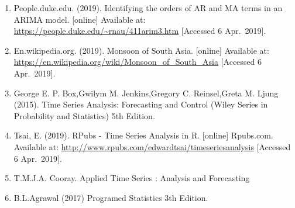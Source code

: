 \documentclass[12pt,openany]{book}
\begin{document}
\begin{enumerate}
\def\labelenumi{\arabic{enumi}.}
\item
  People.duke.edu. (2019). Identifying the orders of AR and MA terms in an ARIMA model. {[}online{]} Available at: \url{https://people.duke.edu/~rnau/411arim3.htm} {[}Accessed 6 Apr.~2019{]}.
\item
  En.wikipedia.org. (2019). Monsoon of South Asia. {[}online{]} Available at: \url{https://en.wikipedia.org/wiki/Monsoon_of_South_Asia} {[}Accessed 6 Apr.~2019{]}.
\item
  George E. P. Box,Gwilym M. Jenkins,Gregory C. Reinsel,Greta M. Ljung (2015). Time Series Analysis: Forecasting and Control (Wiley Series in Probability and Statistics) 5th Edition.
\item
  Tsai, E. (2019). RPubs - Time Series Analysis in R. {[}online{]} Rpubs.com. Available at: \url{http://www.rpubs.com/edwardtsai/timeseriesanalysis} {[}Accessed 6 Apr.~2019{]}.
\item
  T.M.J.A. Cooray. Applied Time Series : Analysis and Forecasting
\item
  B.L.Agrawal (2017) Programed Statistics 3th Edition.
\end{enumerate}


\end{document}
